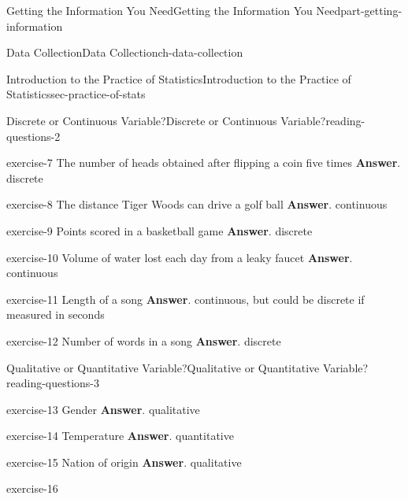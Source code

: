 \documentclass[oneside,10pt,]{book}
\numberwithin{equation}{section}
\begin{document}
\begin{partptx}{Getting the Information You Need}{}{Getting the Information You Need}{}{}{part-getting-information}
\begin{chapterptx}{Data Collection}{}{Data Collection}{}{}{ch-data-collection}
\begin{sectionptx}{Introduction to the Practice of Statistics}{}{Introduction to the Practice of Statistics}{}{}{sec-practice-of-stats}
\begin{reading-questions-subsection-numberless}{Discrete or Continuous Variable?}{}{Discrete or Continuous Variable?}{}{}{reading-questions-2}
\begin{divisionexercise}{2}{}{}{exercise-7}
The number of heads obtained after flipping a coin five times \textbf{Answer}.\hypertarget{answer-7}{}\quad%
discrete\end{divisionexercise}%
\begin{divisionexercise}{3}{}{}{exercise-8}%
The distance Tiger Woods can drive a golf ball \textbf{Answer}.\hypertarget{answer-8}{}\quad%
continuous\end{divisionexercise}%
\begin{divisionexercise}{4}{}{}{exercise-9}%
Points scored in a basketball game \textbf{Answer}.\hypertarget{answer-9}{}\quad%
discrete\end{divisionexercise}%
\begin{divisionexercise}{5}{}{}{exercise-10}%
Volume of water lost each day from a leaky faucet \textbf{Answer}.\hypertarget{answer-10}{}\quad%
continuous\end{divisionexercise}%
\begin{divisionexercise}{6}{}{}{exercise-11}%
Length of a song \textbf{Answer}.\hypertarget{answer-11}{}\quad%
continuous, but could be discrete if measured in seconds\end{divisionexercise}%
\begin{divisionexercise}{7}{}{}{exercise-12}%
Number of words in a song \textbf{Answer}.\hypertarget{answer-12}{}\quad%
discrete\end{divisionexercise}%
\end{reading-questions-subsection-numberless}
%
%
\typeout{************************************************}
\typeout{************************************************}
%
\begin{reading-questions-subsection-numberless}{Qualitative or Quantitative Variable?}{}{Qualitative or Quantitative Variable?}{}{}{reading-questions-3}
\begin{divisionexercise}{1}{}{}{exercise-13}%
Gender \textbf{Answer}.\hypertarget{answer-13}{}\quad%
qualitative\end{divisionexercise}%
\begin{divisionexercise}{2}{}{}{exercise-14}%
Temperature \textbf{Answer}.\hypertarget{answer-14}{}\quad%
quantitative\end{divisionexercise}%
\begin{divisionexercise}{3}{}{}{exercise-15}%
Nation of origin \textbf{Answer}.\hypertarget{answer-15}{}\quad%
qualitative\end{divisionexercise}%
\begin{divisionexercise}{4}{}{}{exercise-16}%

\end{divisionexercise}
\end{reading-questions-subsection-numberless}
\end{sectionptx}
\end{chapterptx}
\end{partptx}
\end{document}
